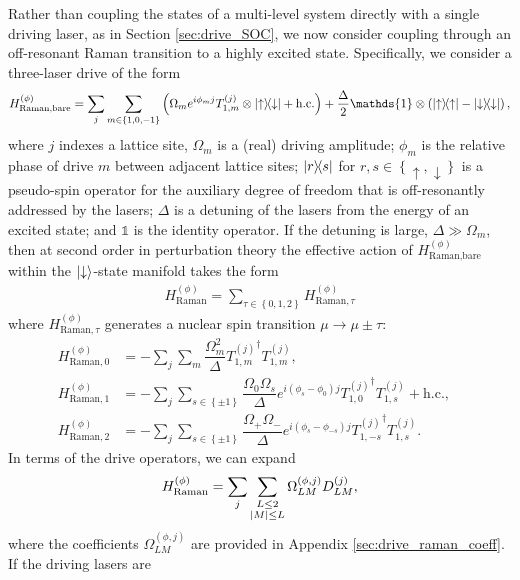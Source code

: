 \documentclass[nofootinbib,notitlepage,11pt]{revtex4-2}
\renewcommand{\t}{\text} %
\newcommand{\f}[2]{\dfrac{#1}{#2}} %
\newcommand{\p}[1]{\left(#1\right)} %
\renewcommand{\set}[1]{\left\{#1\right\}} %
\newcommand{\1}{\mathds{1}}
\newcommand{\up}{\uparrow}
\newcommand{\dn}{\downarrow}
\begin{document}
Rather than coupling the states of a multi-level system directly with
a single driving laser, as in Section \ref{sec:drive_SOC}, we now
consider coupling through an off-resonant Raman transition to a highly
excited state.  Specifically, we consider a three-laser drive of the
form
\begin{align}
  H_{\t{Raman,bare}}^{(\phi)}
  = \sum_j \sum_{m\in\set{1,0,-1}} \p{\Omega_m e^{i\phi_m j}
    T_{1,m}^{(j)} \otimes \op{\up}{\dn} + \t{h.c.}}
  + \f{\Delta}{2} \1 \otimes \p{\op{\up} - \op{\dn}},
  \label{eq:raman_bare}
\end{align}
where $j$ indexes a lattice site, $\Omega_m$ is a (real) driving
amplitude; $\phi_m$ is the relative phase of drive $m$ between
adjacent lattice sites; $\op{r}{s}$ for $r,s\in\set{\up,\dn}$ is a
pseudo-spin operator for the auxiliary degree of freedom that is
off-resonantly addressed by the lasers; $\Delta$ is a detuning of the
lasers from the energy of an excited state; and $\1$ is the identity
operator.  If the detuning is large, $\Delta\gg\Omega_m$, then at
second order in perturbation theory the effective action of
$H_{\t{Raman,bare}}^{(\phi)}$ within the $\ket{\dn}$-state manifold
takes the form
\begin{align}
  H_{\t{Raman}}^{(\phi)}
  = \sum_{\tau\in\set{0,1,2}} H_{\t{Raman},\tau}^{(\phi)}
\end{align}
where $H_{\t{Raman},\tau}^{(\phi)}$ generates a nuclear spin
transition $\mu\to\mu\pm\tau$:
\begin{align}
  H_{\t{Raman},0}^{(\phi)}
  &= -\sum_j\sum_m \f{\Omega_m^2}{\Delta}
  {T_{1,m}^{(j)}}^\dag T_{1,m}^{(j)}, & \label{eq:raman_0} \\
  H_{\t{Raman},1}^{(\phi)}
  &= -\sum_j\sum_{s\in\set{\pm1}}
  \f{\Omega_0\Omega_s}{\Delta} e^{i\p{\phi_s-\phi_0} j}
  {T_{1,0}^{(j)}}^\dag T_{1,s}^{(j)} + \t{h.c.},
  \\
  H_{\t{Raman},2}^{(\phi)}
  &= -\sum_j\sum_{s\in\set{\pm1}}
  \f{\Omega_+\Omega_-}{\Delta} e^{i\p{\phi_s-\phi_{-s}}j}
  {T_{1,-s}^{(j)}}^\dag T_{1,s}^{(j)}.
  \label{eq:raman_2}
\end{align}
In terms of the drive operators, we can expand
\begin{align}
  H_{\t{Raman}}^{(\phi)}
  = \sum_j \sum_{\substack{L\le2\\\abs{M}\le L}}
  \Omega_{LM}^{(\phi,j)} D_{LM}^{(j)},
  \label{eq:raman_drive}
\end{align}
where the coefficients $\Omega_{LM}^{(\phi,j)}$ are provided in
Appendix \ref{sec:drive_raman_coeff}.  If the driving lasers are
\end{document}

